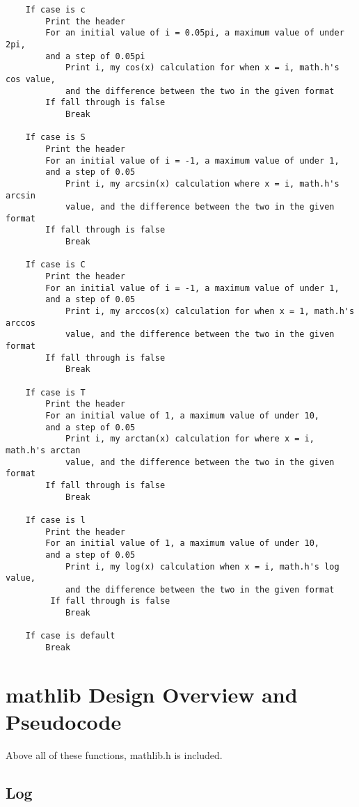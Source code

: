 \documentclass[11pt]{article}
\begin{document}
\begin{verbatim}
    If case is c
        Print the header
        For an initial value of i = 0.05pi, a maximum value of under 2pi,
        and a step of 0.05pi
            Print i, my cos(x) calculation for when x = i, math.h's cos value,
            and the difference between the two in the given format
        If fall through is false
            Break

    If case is S
        Print the header
        For an initial value of i = -1, a maximum value of under 1,
        and a step of 0.05
            Print i, my arcsin(x) calculation where x = i, math.h's arcsin
            value, and the difference between the two in the given format
        If fall through is false
            Break

    If case is C
        Print the header
        For an initial value of i = -1, a maximum value of under 1,
        and a step of 0.05
            Print i, my arccos(x) calculation for when x = 1, math.h's arccos
            value, and the difference between the two in the given format
        If fall through is false
            Break

    If case is T
        Print the header
        For an initial value of 1, a maximum value of under 10,
        and a step of 0.05
            Print i, my arctan(x) calculation for where x = i, math.h's arctan
            value, and the difference between the two in the given format
        If fall through is false
            Break

    If case is l
        Print the header
        For an initial value of 1, a maximum value of under 10,
        and a step of 0.05
            Print i, my log(x) calculation when x = i, math.h's log value,
            and the difference between the two in the given format
         If fall through is false
            Break

    If case is default
        Break

\end{verbatim}

\section{mathlib Design Overview and Pseudocode}\label{ss:lib}

Above all of these functions, mathlib.h is included.

\subsection{Log}
\end{document}
